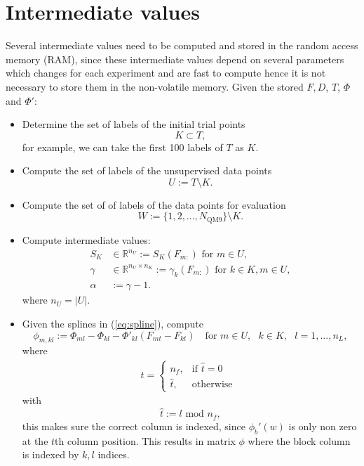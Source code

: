 \documentclass[12pt]{article}
\begin{document}
\section{Intermediate values}
\label{sec:intermediate}
Several intermediate values need to be computed and stored in the random access memory (RAM), since these intermediate values depend on several parameters which changes for each experiment and are fast to compute hence it is not necessary to store them in the non-volatile memory. Given the stored $F, D$, $T$, $\Phi$ and $\Phi'$:
\begin{itemize}
	\item Determine the set of labels of the initial trial points
	\begin{equation}
		K \subset T,
	\end{equation}
	for example, we can take the first 100 labels of $T$ as $K$.
	\item Compute the set of labels of the unsupervised data points
	\begin{equation}
		U := T \setminus K.
	\end{equation}
	\item Compute the set of of labels of the data points for evaluation
	\begin{equation}
		W := \{1,2,...,N_\text{QM9}\} \setminus K.
	\end{equation}
	\item Compute intermediate values:
	\begin{equation}
		\label{eq:intermediate}
		\begin{split}
			S_K &\in \mathbb{R}^{n_U} := S_K(F_{m:}) \text{ for } m \in U,\\
			\gamma &\in \mathbb{R}^{n_U \times n_K} := \gamma_k(F_{m:}) \text{ for } k \in K, m \in U, \\
			\alpha &:= \gamma - 1.
		\end{split}
	\end{equation}
	where $n_U = |U|.$
	\item Given the splines in (\ref{eq:spline}), compute
	\begin{equation} %
		\phi_{m, kl} := \Phi_{ml} - \Phi_{kl} - \Phi'_{kl}(F_{mt}-F_{kt}) \quad \text{for } m \in U, \text{ }k \in K, \text{ }l = 1,...,n_L,
	\end{equation}
	where
	\begin{equation}
		\begin{split}
			t = 
			\begin{cases}
				n_f,  & \text{if } \hat{t} = 0 \\
				\hat{t}, & \text{otherwise}
			\end{cases}
			~~ 
		\end{split}
	\end{equation}
	with
	\begin{equation}
		\hat{t} := l \text{ mod } n_f,
	\end{equation}
	this makes sure the correct column is indexed, since $\phi_b'(w)$ is only non zero at the $t$th column position. This results in matrix $\phi$ where the block column is indexed by $k,l$ indices.
\end{itemize}
\end{document}
